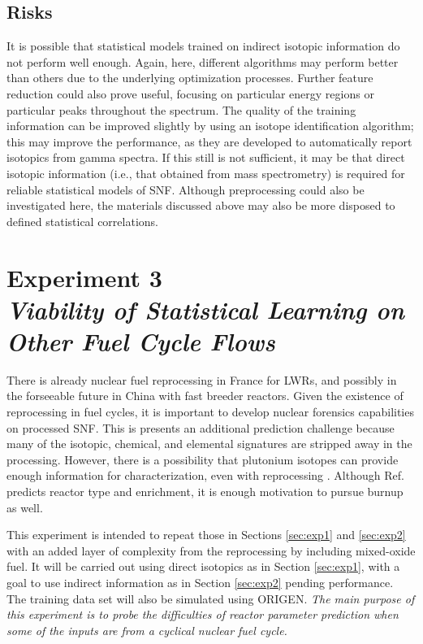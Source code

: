 \subsection*{Risks}

It is possible that statistical models trained on indirect isotopic information
do not perform well enough. Again, here, different algorithms may perform
better than others due to the underlying optimization processes. Further
feature reduction could also prove useful, focusing on particular energy
regions or particular peaks throughout the spectrum. The quality of the
training information can be improved slightly by using an isotope
identification algorithm; this may improve the performance, as they are
developed to automatically report isotopics from gamma spectra. If this still
is not sufficient, it may be that direct isotopic information (i.e., that
obtained from mass spectrometry) is required for reliable statistical models of
\gls{SNF}.  Although preprocessing could also be investigated here, the
materials discussed above may also be more disposed to defined statistical
correlations.

\section[Experiment 3: Other Fuel Cycle Flows]{Experiment 3\\ 
\large{\textit{Viability of Statistical Learning on Other Fuel Cycle Flows}}}
\label{sec:exp3}

There is already nuclear fuel reprocessing in France for \gls{LWR}s, and
possibly in the forseeable future in China with fast breeder reactors.  Given
the existence of reprocessing in fuel cycles, it is important to develop
nuclear forensics capabilities on processed \gls{SNF}. This is presents an
additional prediction challenge because many of the isotopic, chemical, and
elemental signatures are stripped away in the processing. However, there is a
possibility that plutonium isotopes can provide enough information for
characterization, even with reprocessing \cite{pu_discrimination}. Although
Ref. \cite{pu_discrimination} predicts reactor type and enrichment, it is
enough motivation to pursue burnup as well. 

This experiment is intended to repeat those in Sections \ref{sec:exp1} and
\ref{sec:exp2} with an added layer of complexity from the reprocessing by
including mixed-oxide fuel.  It will be carried out using direct isotopics as
in Section \ref{sec:exp1}, with a goal to use indirect information as in
Section \ref{sec:exp2} pending performance. The training data set will also be
simulated using \gls{ORIGEN}.  \textit{The main purpose of this experiment is
to probe the difficulties of reactor parameter prediction when some of the
inputs are from a cyclical nuclear fuel cycle.}

